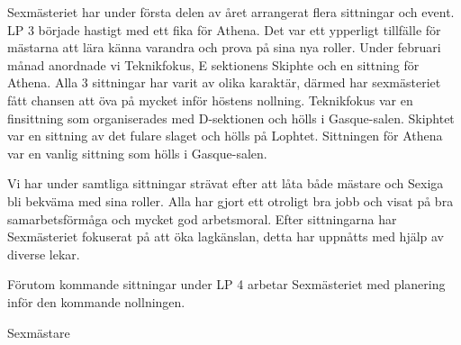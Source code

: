 \documentclass[../_main/handlingar.tex]{subfiles}
\begin{document}
Sexmästeriet har under första delen av året arrangerat flera sittningar och event. LP 3 började hastigt med ett fika för Athena. Det var ett ypperligt tillfälle för mästarna att lära känna varandra och prova på sina nya roller. Under februari månad anordnade vi Teknikfokus, E sektionens Skiphte och en sittning för Athena. Alla 3 sittningar har varit av olika karaktär, därmed har sexmästeriet fått chansen att öva på mycket inför höstens nollning. Teknikfokus var en finsittning som organiserades med D-sektionen och hölls i Gasque-salen. Skiphtet var en sittning av det fulare slaget och hölls på Lophtet. Sittningen för Athena var en vanlig sittning som hölls i Gasque-salen.

Vi har under samtliga sittningar strävat efter att låta både mästare och Sexiga bli bekväma med sina roller. Alla har gjort ett otroligt bra jobb och visat på bra samarbetsförmåga och mycket god arbetsmoral. Efter sittningarna har Sexmästeriet fokuserat på att öka lagkänslan, detta har uppnåtts med hjälp av diverse lekar.

Förutom kommande sittningar under LP 4 arbetar Sexmästeriet med planering inför den kommande nollningen.
\begin{signatures}{1}
    \mvh
    \signature{Alexander Wik}{Sexmästare}
\end{signatures}
\end{document}
